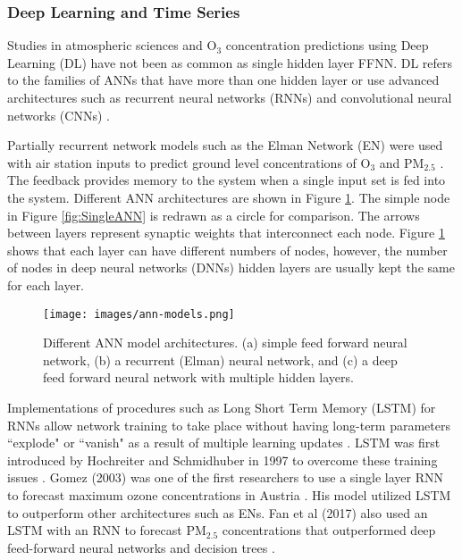 \subsubsection{Deep Learning and Time Series}
Studies in atmospheric sciences and O$_{3}$ concentration predictions using Deep Learning (DL) have not been as common as single hidden layer FFNN. DL refers to the families of ANNs that have more than one hidden layer or use advanced architectures such as recurrent neural networks (RNNs) and convolutional neural networks (CNNs) \citep{Goodfellow2016}. 

Partially recurrent network models such as the Elman Network (EN) were used with air station inputs to predict ground level concentrations of O$_{3}$ \citep{Biancofiore2015} and PM$_{2.5}$ \citep{Biancofiore2017}. The feedback provides memory to the system when a single input set is fed into the system. Different ANN architectures are shown in Figure \ref{fig:ANNmodels}. The simple node in Figure \ref{fig:SingleANN} is redrawn as a circle for comparison.  The arrows between layers represent synaptic weights that interconnect each node. Figure \ref{fig:ANNmodels} shows that each layer can have different numbers of nodes, however, the number of nodes in deep neural networks (DNNs) hidden layers are usually kept the same for each layer.
%
\begin{figure}[H]
\centering
\texttt{[image: images/ann-models.png]} 
\caption[Different ANN model architectures.]{Different ANN model architectures. (a) simple feed forward neural network, (b) a recurrent (Elman) neural network, and (c) a deep feed forward neural network with multiple hidden layers.}
\label{fig:ANNmodels}
\end{figure}
%

Implementations of procedures such as Long Short Term Memory (LSTM) for RNNs allow network training to take place without having long-term parameters ``explode" or ``vanish" as a result of multiple learning updates \citep{Pascanu2013}. LSTM was first introduced by Hochreiter and Schmidhuber in 1997  to overcome these training issues \citep{Hochreiter1997}. Gomez (2003) was one of the first researchers to use a single layer RNN to forecast maximum ozone concentrations in Austria \citep{Gomez2003}. His model utilized LSTM to outperform other architectures such as ENs. Fan et al (2017) also used an LSTM with an RNN to forecast PM$_{2.5}$ concentrations that outperformed deep feed-forward neural networks and decision trees \citep{Fan2017}.  

